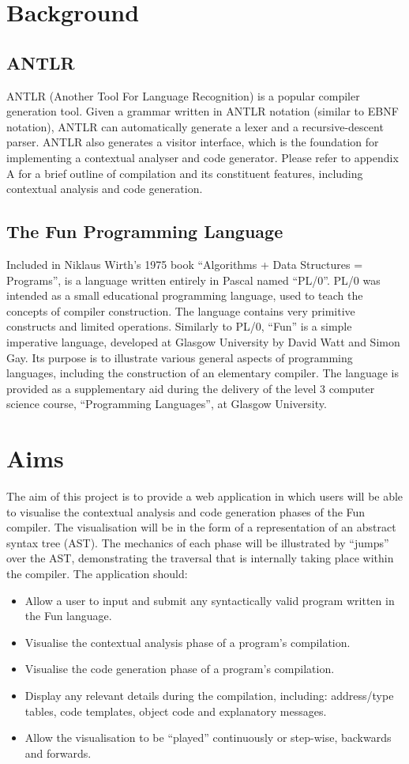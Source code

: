 \documentclass{l4proj}
\begin{document}
\section{Background}
\subsection{ANTLR}
ANTLR (Another Tool For Language Recognition) is a popular compiler generation tool. Given a grammar written in ANTLR notation (similar to EBNF notation), ANTLR can automatically generate a lexer and a recursive-descent parser. ANTLR also generates a visitor interface, which is the foundation for implementing a contextual analyser and code generator. Please refer to appendix A for a brief outline of compilation and its constituent features, including contextual analysis and code generation.

\subsection{The Fun Programming Language}
Included in Niklaus Wirth's 1975 book ``Algorithms + Data Structures = Programs'', is a language written entirely in Pascal named ``PL/0''. PL/0 was intended as a small educational programming language, used to teach the concepts of compiler construction. The language contains very primitive constructs and limited operations. Similarly to PL/0, ``Fun'' is a simple imperative language, developed at Glasgow University by David Watt and Simon Gay. Its purpose is to illustrate various general aspects of programming languages, including the construction of an elementary compiler. The language is provided as a supplementary aid during the delivery of the level 3 computer science course, ``Programming Languages'', at Glasgow University.

\section{Aims}
The aim of this project is to provide a web application in which users will be able to visualise the contextual analysis and code generation phases of the Fun compiler. The visualisation will be in the form of a representation of an abstract syntax tree (AST). The mechanics of each phase will be illustrated by ``jumps'' over the AST, demonstrating the traversal that is internally taking place within the compiler. The application should:
\begin{itemize}
\item Allow a user to input and submit any syntactically valid program written in the Fun language.
\item Visualise the contextual analysis phase of a program's compilation. 
\item Visualise the code generation phase of a program's compilation.
\item Display any relevant details during the compilation, including: address/type tables, code templates, object code and explanatory messages.
\item Allow the visualisation to be ``played'' continuously or step-wise, backwards and forwards.
\end{itemize}
\end{document}
